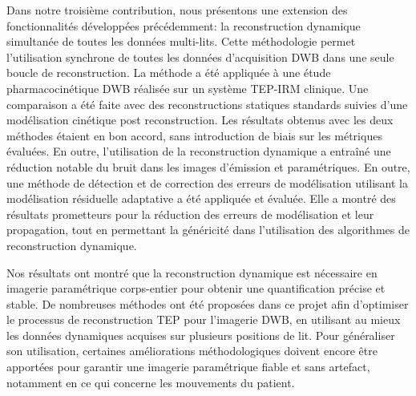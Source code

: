 {Dans notre troisième contribution, nous présentons une extension des fonctionnalités développées précédemment: la reconstruction dynamique simultanée de toutes les données multi-lits. Cette méthodologie permet l'utilisation synchrone de toutes les données d'acquisition DWB dans une seule boucle de reconstruction. La méthode a été appliquée à une étude pharmacocinétique DWB réalisée sur un système TEP-IRM clinique. Une comparaison a été faite avec des reconstructions statiques standards suivies d'une modélisation cinétique post reconstruction. Les résultats obtenus avec les deux méthodes étaient en bon accord, sans introduction de biais sur les métriques évaluées. En outre, l'utilisation de la reconstruction dynamique a entraîné une réduction notable du bruit dans les images d’émission et paramétriques. En outre, une méthode de détection et de correction des erreurs de modélisation utilisant la modélisation résiduelle adaptative a été appliquée et évaluée. Elle a montré des résultats prometteurs pour la réduction des erreurs de modélisation et leur propagation, tout en permettant la généricité dans l'utilisation des algorithmes de reconstruction dynamique.

Nos résultats ont montré que la reconstruction dynamique est nécessaire en imagerie paramétrique corps-entier pour obtenir une quantification précise et stable. De nombreuses méthodes ont été proposées dans ce projet afin d’optimiser le processus de reconstruction TEP pour l'imagerie DWB, en utilisant au mieux les données dynamiques acquises sur plusieurs positions de lit. Pour généraliser son utilisation, certaines améliorations méthodologiques doivent encore être apportées pour garantir une imagerie paramétrique fiable et sans artefact, notamment en ce qui concerne les mouvements du patient.
}															%

